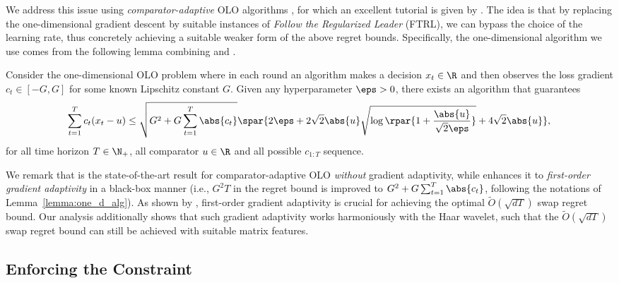 \documentclass[10pt]{article}
\begin{document}
We address this issue using \emph{comparator-adaptive} OLO algorithms \citep{streeter2012no,mcmahan2014unconstrained,orabona2016coin}, for which an excellent tutorial is given by \citep[Chapter~9]{orabona2023modern}. The idea is that by replacing the one-dimensional gradient descent by suitable instances of \emph{Follow the Regularized Leader} (FTRL), we can bypass the choice of the learning rate, thus concretely achieving a suitable weaker form of the above regret bounds. Specifically, the one-dimensional algorithm we use comes from the following lemma combining \citep[Theorem~4]{zhang2022pde} and \citep[Theorem~5.8]{cutkosky2018algorithms}. 

\begin{lemma}\label{lemma:one_d_alg}
Consider the one-dimensional OLO problem where in each round an algorithm makes a decision $x_t\in\R$ and then observes the loss gradient $c_t\in [-G,G]$ for some known Lipschitz constant $G$. Given any hyperparameter $\eps>0$, there exists an algorithm that guarantees
\begin{equation*}
\sum_{t=1}^Tc_t(x_t-u)\leq \sqrt{G^2+G\sum_{t=1}^T\abs{c_t}}\spar{2\eps+2\sqrt{2}\abs{u}\sqrt{\log\rpar{1+\frac{\abs{u}}{\sqrt{2}\eps}}}+4\sqrt{2}\abs{u}},
\end{equation*}
for all time horizon $T\in\N_+$, all comparator $u\in\R$ and all possible $c_{1:T}$ sequence. 
\end{lemma}

We remark that \citep[Theorem~4]{zhang2022pde} is the state-of-the-art result for comparator-adaptive OLO \emph{without} gradient adaptivity, while \citep[Theorem~5.8]{cutkosky2018algorithms} enhances it to \emph{first-order gradient adaptivity} in a black-box manner (i.e., $G^2T$ in the regret bound is improved to $G^2+G\sum_{t=1}^T\abs{c_t}$, following the notations of Lemma~\ref{lemma:one_d_alg}). As shown by \cite{blum2007external}, first-order gradient adaptivity is crucial for achieving the optimal $\tilde O(\sqrt{dT})$ swap regret bound. Our analysis additionally shows that such gradient adaptivity works harmoniously with the Haar wavelet, such that the $\tilde O(\sqrt{dT})$ swap regret bound can still be achieved with suitable matrix features.


\subsection{Enforcing the Constraint}\label{subsection:constraint}
\end{document}
